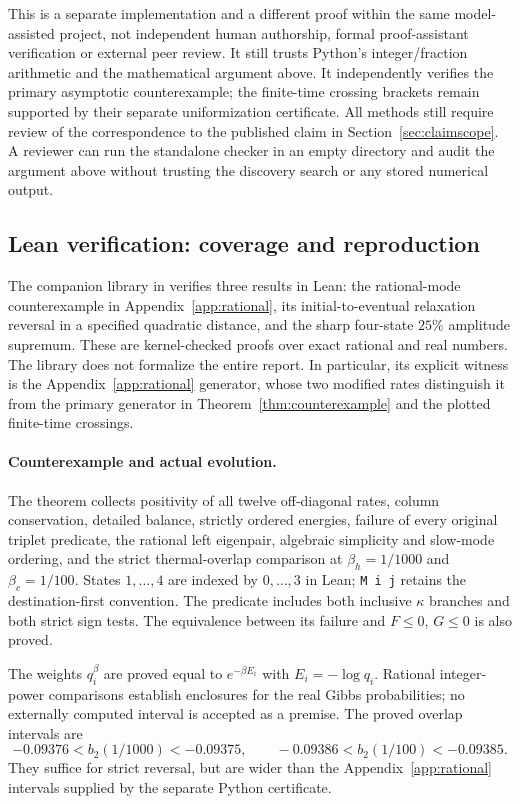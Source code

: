 \documentclass[11pt]{article}
\begin{document}
This is a separate implementation and a different proof within the same model-assisted project, not independent human authorship, formal proof-assistant verification or external peer review. It still trusts Python's integer/fraction arithmetic and the mathematical argument above. It independently verifies the primary asymptotic counterexample; the finite-time crossing brackets remain supported by their separate uniformization certificate. All methods still require review of the correspondence to the published claim in Section~\ref{sec:claimscope}. A reviewer can run the standalone checker in an empty directory and audit the argument above without trusting the discovery search or any stored numerical output.

\subsection{Lean verification: coverage and reproduction}\label{sec:lean}
The companion library in  verifies three results in Lean: the
rational-mode counterexample in Appendix~\ref{app:rational}, its
initial-to-eventual relaxation reversal in a specified quadratic distance,
and the sharp four-state $25\%$ amplitude supremum. These are kernel-checked
proofs over exact rational and real numbers. The library does not formalize
the entire report. In particular, its explicit witness is the Appendix~\ref{app:rational}
generator, whose two modified rates distinguish it from the primary generator
in Theorem~\ref{thm:counterexample} and the plotted finite-time crossings.

\paragraph{Counterexample and actual evolution.}
The theorem  collects positivity of all
twelve off-diagonal rates, column conservation, detailed balance, strictly
ordered energies, failure of every original triplet predicate, the rational
left eigenpair, algebraic simplicity and slow-mode ordering, and the strict
thermal-overlap comparison at $\beta_h=1/1000$ and $\beta_c=1/100$.
States $1,\ldots,4$ are indexed by $0,\ldots,3$ in Lean; \texttt{M i j}
retains the destination-first convention. The predicate includes both
inclusive $\kappa$ branches and both strict sign tests. The equivalence
between its failure and $F\leq0$, $G\leq0$ is also proved.

The weights $q_i^\beta$ are proved equal to $e^{-\beta E_i}$ with
$E_i=-\log q_i$. Rational integer-power comparisons establish enclosures
for the real Gibbs probabilities; no externally computed interval is
accepted as a premise. The proved overlap intervals are
\[
 -0.09376<b_2(1/1000)<-0.09375,\qquad
 -0.09386<b_2(1/100)<-0.09385.
\]
They suffice for strict reversal, but are wider than the Appendix~\ref{app:rational}
intervals supplied by the separate Python certificate.
\end{document}

